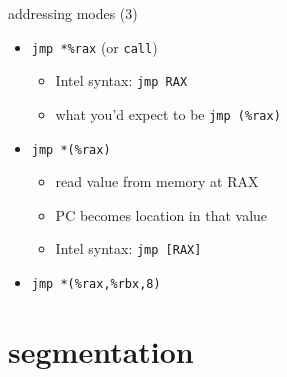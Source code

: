 \begin{frame}[fragile,label=addressing3]{addressing modes (3)}
    \begin{itemize}
        \item {\tt jmp *\%rax} (or {\tt call})
        \begin{itemize}
        \item Intel syntax: {\tt jmp RAX}
        \item what you'd expect to be {\tt jmp (\%rax)}
        \end{itemize}
        \item {\tt jmp *(\%rax)}
        \begin{itemize}
        \item read value from memory at RAX
        \item PC becomes location in that value
        \item Intel syntax: {\tt jmp [RAX]}
        \end{itemize}
        \item {\tt jmp *(\%rax,\%rbx,8)}
    \end{itemize}
\end{frame}

\section{segmentation}

